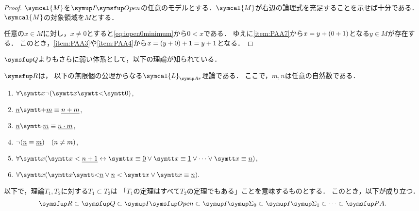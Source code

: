\begin{proof}
	\(\symcal{M}\)を\(\OpenFormulaInduction\)の任意のモデルとする．\(\symcal{M}\)が右辺の論理式を充足することを示せば十分である．
	\(\symcal{M}\)の対象領域を\(M\)とする．

	任意の\(x \in M\)に対し，\(x \neq 0\)とすると\cref{eq:iopen0minimum}から\(0 < x\)である．
	ゆえに\cref{item:PAA7}から\(x = y + \paren{0 + 1}\)となる\(y \in M\)が存在する．
	このとき，\cref{item:PAA3}や\cref{item:PAA4}から\(x = \paren{y + 0} + 1 = y + 1\)となる．
\end{proof}


\(\Robinson\)よりもさらに弱い体系として，以下の理論が知られている．

\begin{Def} \label{Def:RArithmetic}
	\(\RArithmetic\)は，
	以下の無限個の公理からなる\(\symcal{L}_{\Ar}\)理論である．
	ここで，\(m, n\)は任意の自然数である．

	\begin{enumerate}[label=R\arabic*.,ref=R\arabic*]
		\item \label{item:RR1} \(\forall \obj{x} \lnot \paren{\obj{x} \obj{<} \obj{0}}\),
		\item \label{item:RR2} \(\numeral{n} \obj{+} \numeral{m} \objeq \numeral{n + m}\),
		\item \label{item:RR3} \(\numeral{n} \obj{\cdot} \numeral{m} \objeq \numeral{n \cdot m}\),
		\item \label{item:RR4} \(\lnot \paren{\numeral{n} \objeq \numeral{m}} \quad (n \neq m)\),
		\item \label{item:RR5} \(\forall \obj{x} \paren{\obj{x} < \numeral{n + 1} \formulaequiv \obj{x} \objeq \numeral{0} \lor \obj{x} \objeq \numeral{1} \lor \dotsb \lor \obj{x} \objeq \numeral{n}}\),
		\item \label{item:RR6} \(\forall \obj{x} \paren{\obj{x} \obj{<} \numeral{n} \lor \numeral{n} < \obj{x} \lor \obj{x} \objeq \numeral{n}}.\)
	\end{enumerate}
\end{Def}


\begin{Thm} \label{Thm:TheoryHierarchy}
	以下で，理論\(T_1, T_2\)に対する\(T_1 \subset T_2\)は
	「\(T_1\)の定理はすべて\(T_2\)の定理でもある」ことを意味するものとする．
	このとき，以下が成り立つ．
	\begin{equation}
		\RArithmetic \subset \Robinson \subset \OpenFormulaInduction \subset \SigmaFormulaInduction_0 \subset \SigmaFormulaInduction_1 \subset \dotsb \subset \PA.
		\label{eq:TheoryHierarchy}
	\end{equation}
\end{Thm}

